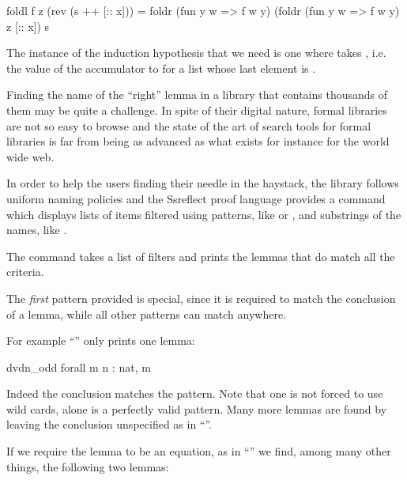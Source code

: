 \begin{coqout}{}{}
foldl f z (rev (s ++ [:: x])) =
  foldr (fun y w => f w y) (foldr (fun y w => f w y) z [:: x]) s
\end{coqout}

The instance of the induction hypothesis that we need is
one where  takes ,
i.e. the value of the accumulator to  for a list
whose last element is .

\label{sec:search}


Finding the name of the ``right'' lemma in a library that contains
thousands of them may be quite a challenge. In spite of their digital
nature, formal libraries are not so easy to browse and the state
of the art of search tools for formal libraries is far from being as
advanced as what exists for instance for the world wide web.

In order to help the users finding their needle in the haystack,
the \mcbMC{} library follows uniform naming policies and the Ssreflect
proof language provides a  command which displays lists of
items filtered using patterns, like \C{(_ * _ + _)}
or , and substrings of the names, like .



The  command takes a list of filters and prints the lemmas
that do match all the criteria.

The \emph{first} pattern provided is special, since it is required to match
the conclusion of a lemma, while all other patterns can match anywhere.

For example ``'' only prints one lemma:

\begin{coq}{}{}
dvdn_odd  forall m n : nat, m %
\end{coq}
Indeed the conclusion matches the pattern.  Note that one is not forced to
use wild cards,  alone is a perfectly valid pattern.  Many more
lemmas are found by leaving the conclusion unspecified as in ``''.

If we require the lemma to be an equation, as in ``'' we find,
among many other things, the following two lemmas:

